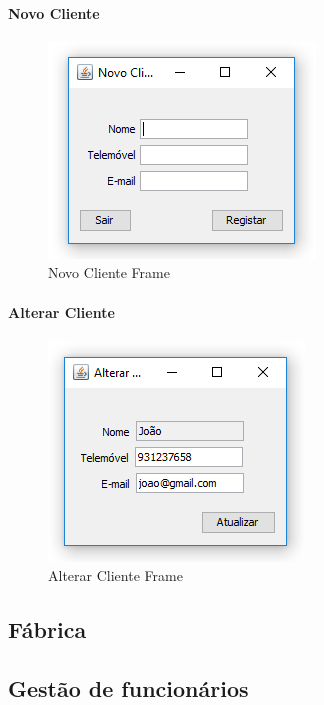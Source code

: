\documentclass[11pt]{article} %
\begin{document}
\paragraph{Novo Cliente} \newline
\begin{figure}[H]
	\centering
	\includegraphics[]{novoclienteframe.png}
	\caption{Novo Cliente Frame}
	\label{novoclienteframe}
\end{figure}


\paragraph{Alterar Cliente} \newline
\begin{figure}[H]
	\centering
	\includegraphics[]{alterarclienteframe.png}
	\caption{Alterar Cliente Frame}
	\label{alterarclienteframe}
\end{figure}


\subsection{Fábrica}
\label{fabricasec}



\subsection{Gestão de funcionários}
\label{adminsec}
\end{document}
